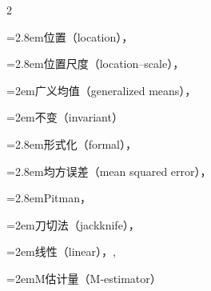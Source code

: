 \begin{multicols}{2}
\par\noindent\hangindent=2.8em\hspace*{1.8em}\label{idx:784}位置（location），\hyperref[exercise:6.41]{\pageref*{exercise:6.41}}\par
\par\noindent\hangindent=2.8em\hspace*{1.8em}\label{idx:785}位置尺度（location–scale），\hyperref[exercise:6.42]{\pageref*{exercise:6.42}}\par
\par\noindent\hangindent=2em\hspace*{1em}\label{idx:786}广义均值（generalized means），\hyperref[exercise:7.16]{\pageref*{exercise:7.16}}\par
{}
\par\noindent\hangindent=2em\hspace*{1em}\label{idx:787}不变（invariant）\par
\par\noindent\hangindent=2.8em\hspace*{1.8em}\label{idx:788}形式化（formal），\hyperref[idxocc:788:301]{\pageref*{idxocc:788:301}}\par
{}
\par\noindent\hangindent=2.8em\hspace*{1.8em}\label{idx:789}均方误差（mean squared error），\hyperref[ex:7.3.6]{\pageref*{ex:7.3.6}}\par
\par\noindent\hangindent=2.8em\hspace*{1.8em}\label{idx:790}Pitman，\hyperref[exercise:7.35]{\pageref*{exercise:7.35}}\par
\par\noindent\hangindent=2em\hspace*{1em}\label{idx:791}刀切法（jackknife），\hyperref[exercise:7.66]{\pageref*{exercise:7.66}}\par
\par\noindent\hangindent=2em\hspace*{1em}\label{idx:792}线性（linear），\hyperref[exercise:7.41]{\pageref*{exercise:7.41}}, \hyperref[eq:11.3.15]{\pageref*{eq:11.3.15}}\par
{}
\par\noindent\hangindent=2em\hspace*{1em}\label{idx:793}M估计量（M-estimator）\par

\end{multicols}
